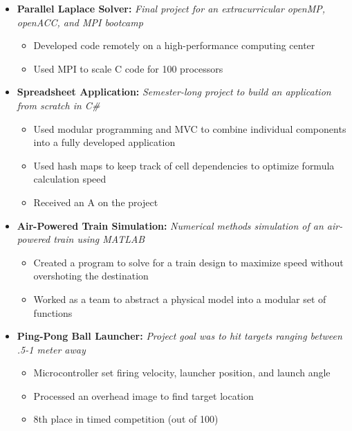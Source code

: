\documentclass{article}
\begin{document}
\begin{itemize}
    \item \textbf{Parallel Laplace Solver:} \textit{Final project for an extracurricular openMP, openACC, and MPI bootcamp}
    \begin{itemize}
        \item Developed code remotely on a high-performance computing center
        \item Used MPI to scale C code for 100 processors
    \end{itemize}
    \vspace{4mm}
    \item \textbf{Spreadsheet Application:}
    \textit{Semester-long project to build an application from scratch in C\#}
    \begin{itemize}
        \item Used modular programming and MVC to combine individual components into a fully developed application
        \item Used hash maps to keep track of cell dependencies to optimize formula calculation speed
        \item Received an A on the project
    \end{itemize}
    \vspace{4mm}
    \item \textbf{Air-Powered Train Simulation:}
         \textit{Numerical methods simulation of an air-powered train using MATLAB}
         \begin{itemize}
             \item Created a program to solve for a train design to maximize speed without overshoting the destination
             \item Worked as a team to abstract a physical model into a modular set of functions
         \end{itemize}
         \vspace{4mm}
    \item \textbf{Ping-Pong Ball Launcher:}
        \textit{Project goal was to hit targets ranging between .5-1 meter away}
        \begin{itemize}
            \item Microcontroller set firing velocity, launcher position, and launch angle
            \item Processed an overhead image to find target location
            \item 8th place in timed competition (out of 100)
        \end{itemize}
\end{itemize}
\end{document}
